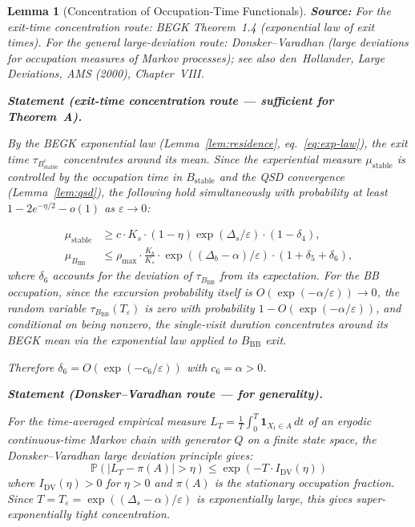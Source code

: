 \documentclass[11pt]{article}
\newtheorem{lemma}{Lemma}
\newcommand{\eps}{\varepsilon}
\newcommand{\Ds}{\Delta_s}
\newcommand{\Db}{\Delta_b}
\newcommand{\Bstable}{B_{\mathrm{stable}}}
\newcommand{\BBB}{B_{\mathrm{BB}}}
\newcommand{\Teps}{T_\eps}
\begin{document}
\begin{lemma}[Concentration of Occupation-Time Functionals]%
\label{lem:concentration}
\textbf{Source:} For the exit-time concentration route:
BEGK \cite{BEGK02} Theorem~1.4 (exponential law of exit times).
For the general large-deviation route:
Donsker--Varadhan \cite{DV75-83} (large deviations for occupation
measures of Markov processes); see also den~Hollander,
\emph{Large Deviations}, AMS (2000), Chapter~VIII.

\medskip
\textbf{Statement (exit-time concentration route --- sufficient for
Theorem~A).}

By the BEGK exponential law (Lemma~\ref{lem:residence},
eq.~\eqref{eq:exp-law}), the exit time $\tau_{\Bstable^c}$
concentrates around its mean. Since the experiential measure
$\mu_{\mathrm{stable}}$ is controlled by the occupation time in
$\Bstable$ and the QSD convergence (Lemma~\ref{lem:qsd}), the
following hold simultaneously with probability at least
$1 - 2e^{-\eta/2} - o(1)$ as $\eps \to 0$:

\begin{align}
  \mu_{\mathrm{stable}}
  &\geq c \cdot K_s \cdot (1-\eta) \exp(\Ds/\eps)
    \cdot (1 - \delta_4),
    \label{eq:conc-stable} \\
  \mu_{\BBB}
  &\leq \rho_{\max} \cdot \frac{K_b}{K_s}
    \cdot \exp((\Db - \alpha)/\eps)
    \cdot (1 + \delta_5 + \delta_6),
    \label{eq:conc-bb}
\end{align}
where $\delta_6$ accounts for the deviation of $\tau_{\BBB}$ from its
expectation. For the BB occupation, since the excursion probability
itself is $O(\exp(-\alpha/\eps)) \to 0$, the random variable
$\tau_{\BBB}(\Teps)$ is zero with probability
$1 - O(\exp(-\alpha/\eps))$, and conditional on being nonzero,
the single-visit duration concentrates around its BEGK mean via
the exponential law applied to $\BBB$ exit.

Therefore $\delta_6 = O(\exp(-c_6/\eps))$ with
$c_6 = \alpha > 0$.

\medskip
\textbf{Statement (Donsker--Varadhan route --- for generality).}

For the time-averaged empirical measure
$L_T = \frac{1}{T}\int_0^T \mathbf{1}_{X_t \in A}\, dt$
of an ergodic continuous-time Markov chain with generator $Q$ on
a finite state space, the Donsker--Varadhan large deviation principle
gives:
\[
  \mathbb{P}(|L_T - \pi(A)| > \eta)
  \leq \exp(-T \cdot I_{\mathrm{DV}}(\eta))
\]
where $I_{\mathrm{DV}}(\eta) > 0$ for $\eta > 0$ and $\pi(A)$ is
the stationary occupation fraction. Since
$T = \Teps = \exp((\Ds - \alpha)/\eps)$ is exponentially large,
this gives super-exponentially tight concentration.


\end{lemma}
\end{document}
